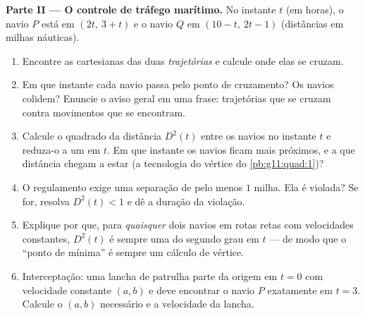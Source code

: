 \begin{problem}
\medskip
\noindent\textbf{Parte II --- O controle de tráfego marítimo.}
No instante $t$ (em horas), o navio $P$ está em $(2t,\ 3 + t)$ e o
navio $Q$ em $(10 - t,\ 2t - 1)$ (distâncias em milhas náuticas).
\begin{enumerate}[resume]
  \item Encontre as  cartesianas das duas
        \emph{trajetórias} e calcule onde elas se cruzam.
  \item Em que instante cada navio passa pelo ponto de
        cruzamento? Os navios colidem? Enuncie o aviso geral em
        uma frase: trajetórias que se cruzam contra movimentos
        que se encontram.
  \item Calcule o quadrado da distância $D^2(t)$ entre os navios
        no instante $t$ e reduza-o a um 
        em $t$. Em que instante os navios ficam mais próximos, e
        a que distância chegam a estar (a tecnologia do vértice
        do \cref{pb:g11:quad:1})?
  \item O regulamento exige uma separação de pelo menos $1$
        milha. Ela é violada? Se for, resolva $D^2(t) < 1$ e dê a
        duração da violação.
  \item Explique por que, para \emph{quaisquer} dois navios em
        rotas retas com velocidades constantes, $D^2(t)$ é sempre
        uma  do segundo grau em $t$ --- de modo que o
        ``ponto de  mínima'' é sempre um cálculo de
        vértice.
  \item Interceptação: uma lancha de patrulha parte da origem em
        $t = 0$ com velocidade constante $(a, b)$ e deve
        encontrar o navio $P$ exatamente em $t = 3$. Calcule o
        $(a, b)$ necessário e a velocidade da lancha.
\end{enumerate}


\end{problem}
